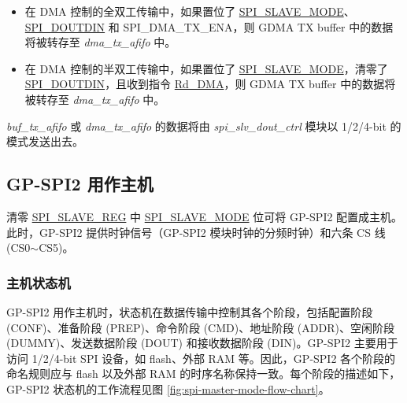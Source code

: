 \documentclass[main\_\_CN.tex]{subfiles}
\begin{document}
\begin{itemize}
\begin{itemize}
        \item 在 DMA 控制的全双工传输中，如果置位了 \hyperref[fielddesc:SPISLAVEMODE]{SPI\_SLAVE\_MODE}、\hyperref[fielddesc:SPIDOUTDIN]{SPI\_DOUTDIN} 和 SPI\_DMA\_TX\_ENA，则 GDMA TX buffer 中的数据将被转存至 \emph{dma\_tx\_afifo} 中。       
        
        \item 在 DMA 控制的半双工传输中，如果置位了 \hyperref[fielddesc:SPISLAVEMODE]{SPI\_SLAVE\_MODE}，清零了 \hyperref[fielddesc:SPIDOUTDIN]{SPI\_DOUTDIN}，且收到指令 \hyperref[cmd:rddma]{Rd\_DMA}，则 GDMA TX buffer 中的数据将被转存至 \emph{dma\_tx\_afifo} 中。
        
    \end{itemize}
    
\emph{buf\_tx\_afifo} 或 \emph{dma\_tx\_afifo} 的数据将由 \emph{spi\_slv\_dout\_ctrl} 模块以 1/2/4-bit 的模式发送出去。
\end{itemize}

\subsection{GP-SPI2 用作主机}\label{sec:gp-spi2-master-mode}
清零 \hyperref[regdesc:SPISLAVEREG]{SPI\_SLAVE\_REG} 中 \hyperref[fielddesc:SPISLAVEMODE]{SPI\_SLAVE\_MODE} 位可将 GP-SPI2 配置成主机。此时，GP-SPI2 提供时钟信号（GP-SPI2 模块时钟的分频时钟）和六条 CS 线 (CS0$\sim$CS5)。
 
\subsubsection{主机状态机}
\label{sec:gp-spi2-state-machine}

GP-SPI2 用作主机时，状态机在数据传输中控制其各个阶段，包括配置阶段 (CONF)、准备阶段 (PREP)、命令阶段 (CMD)、地址阶段 (ADDR)、空闲阶段 (DUMMY)、发送数据阶段 (DOUT) 和接收数据阶段 (DIN)。GP-SPI2 主要用于访问 1/2/4-bit SPI 设备，如 flash、外部 RAM 等。因此，GP-SPI2 各个阶段的命名规则应与 flash 以及外部 RAM 的时序名称保持一致。每个阶段的描述如下，GP-SPI2 状态机的工作流程见图  \ref{fig:spi-master-mode-flow-chart}。
\end{document}
